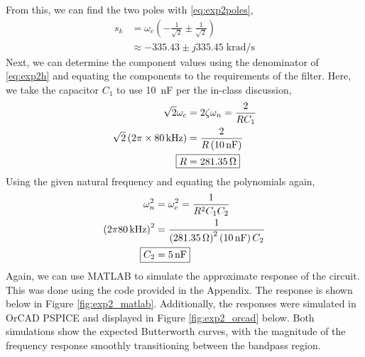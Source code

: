 \documentclass{report}
\begin{document}
From this, we can find the two poles with \eqref{eq:exp2poles}, \begin{align*}
	s_k & = \omega_c \left( -\frac{1}{\sqrt{2}} \pm \frac{1}{\sqrt{2}}\right) \\
		& \approx -335.43 \pm j335.45 \; \si{\kilo \radian\per\s}
\end{align*}
Next, we can determine the component values using the denominator of \eqref{eq:exp2h} and equating the components to the requirements of the filter. Here, we take the capacitor $C_1$ to use \SI{10}{\nano\farad} per the in-class discussion, \begin{align*}
	\sqrt{2} \omega_c & = 2 \zeta \omega_n = \frac{2}{RC_1} \\
	\sqrt{2} \left(2 \pi \times \SI{80}{\kHz}\right) & = \frac{2}{R \left(\SI{10}{\nano\farad}\right)} \\
	\Aboxed{ R & =  \SI{281.35}{\ohm}}
\end{align*}
Using the given natural frequency and equating the polynomials again, \begin{align*}
	\omega_n^2 & = \omega_c^2 = \frac{1}{R^2 C_1 C_2} \\
	\left(2 \pi \SI{80}{\kHz}\right)^2 & = \frac{1}{\left(\SI{281.35}{\ohm}\right)^2 \left(\SI{10}{\nano\farad}\right) C_2} \\
	\Aboxed{C_2 & = \SI{5}{\nano\farad}}
\end{align*}
Again, we can use MATLAB to simulate the approximate response of the circuit. This was done using the code provided in the Appendix. The response is shown below in Figure \ref{fig:exp2_matlab}. Additionally, the responses were simulated in OrCAD PSPICE and displayed in Figure \ref{fig:exp2_orcad} below. Both simulations show the expected Butterworth curves, with the magnitude of the frequency response smoothly transitioning between the bandpass region. 
\end{document}
